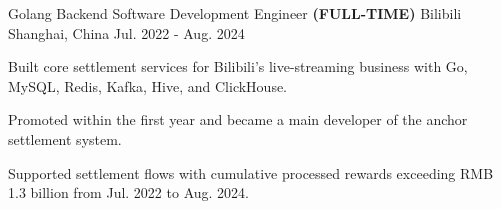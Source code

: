 

\begin{cventries}

  \cventry
    {Golang Backend Software Development Engineer \textbf{\textcolor{awesome-red}{(FULL-TIME)}}}
    {Bilibili}
    {Shanghai, China}
    {Jul. 2022 - Aug. 2024}
    {
      \begin{cvitems}
        \item {Built core settlement services for Bilibili's live-streaming business with Go, MySQL, Redis, Kafka, Hive, and ClickHouse.}
        \item {Promoted within the first year and became a main developer of the anchor settlement system.}
        \item {Supported settlement flows with cumulative processed rewards exceeding RMB 1.3 billion from Jul. 2022 to Aug. 2024.}
      \end{cvitems}
    }

\end{cventries}
